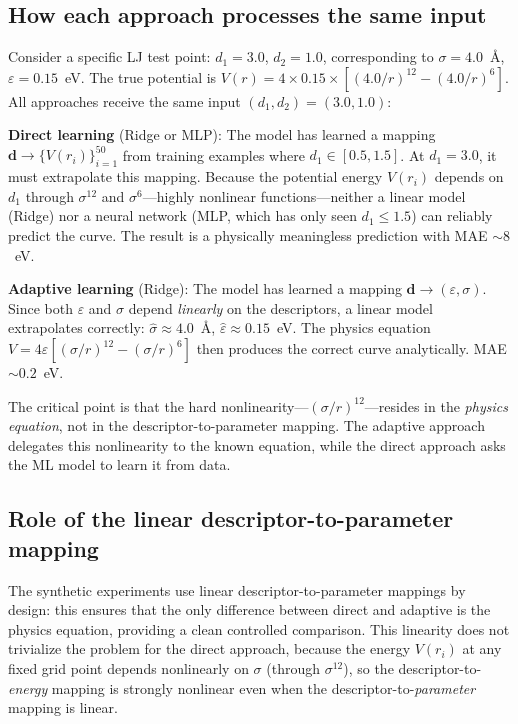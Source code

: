 \documentclass[aps,prb,twocolumn,superscriptaddress,longbibliography,floatfix]{revtex4-2}
\begin{document}
\subsection{How each approach processes the same input}

Consider a specific LJ test point: $d_1 = 3.0$, $d_2 = 1.0$, corresponding to $\sigma = 4.0$~\AA, $\varepsilon = 0.15$~eV. The true potential is $V(r) = 4 \times 0.15 \times [(4.0/r)^{12} - (4.0/r)^6]$. All approaches receive the same input $(d_1, d_2) = (3.0, 1.0)$:

\textbf{Direct learning} (Ridge or MLP): The model has learned a mapping $\mathbf{d} \to \{V(r_i)\}_{i=1}^{50}$ from training examples where $d_1 \in [0.5, 1.5]$. At $d_1 = 3.0$, it must extrapolate this mapping. Because the potential energy $V(r_i)$ depends on $d_1$ through $\sigma^{12}$ and $\sigma^6$---highly nonlinear functions---neither a linear model (Ridge) nor a neural network (MLP, which has only seen $d_1 \leq 1.5$) can reliably predict the curve. The result is a physically meaningless prediction with MAE $\sim 8$~eV.

\textbf{Adaptive learning} (Ridge): The model has learned a mapping $\mathbf{d} \to (\varepsilon, \sigma)$. Since both $\varepsilon$ and $\sigma$ depend \emph{linearly} on the descriptors, a linear model extrapolates correctly: $\hat{\sigma} \approx 4.0$~\AA, $\hat{\varepsilon} \approx 0.15$~eV. The physics equation $V = 4\varepsilon[(\sigma/r)^{12} - (\sigma/r)^6]$ then produces the correct curve analytically. MAE $\sim 0.2$~eV.

The critical point is that the hard nonlinearity---$(\sigma/r)^{12}$---resides in the \emph{physics equation}, not in the descriptor-to-parameter mapping. The adaptive approach delegates this nonlinearity to the known equation, while the direct approach asks the ML model to learn it from data.

\subsection{Role of the linear descriptor-to-parameter mapping}

The synthetic experiments use linear descriptor-to-parameter mappings by design: this ensures that the only difference between direct and adaptive is the physics equation, providing a clean controlled comparison. This linearity does not trivialize the problem for the direct approach, because the energy $V(r_i)$ at any fixed grid point depends nonlinearly on $\sigma$ (through $\sigma^{12}$), so the descriptor-to-\emph{energy} mapping is strongly nonlinear even when the descriptor-to-\emph{parameter} mapping is linear.
\end{document}
